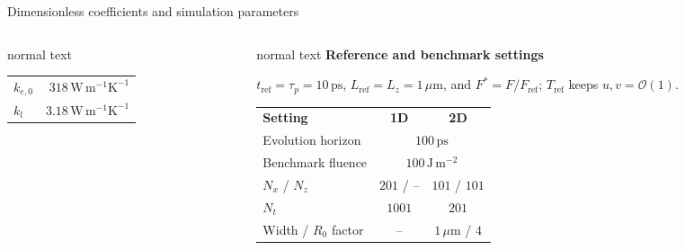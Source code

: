 \documentclass[aspectratio=169,10pt]{beamer}
\begin{document}
\begin{frame}[t]{Dimensionless coefficients and simulation parameters}
\begin{columns}[T,totalwidth=0.94\textwidth]
\begin{column}{0.42\textwidth}
\begin{beamercolorbox}[wd=\linewidth,sep=0.46em]{normal text}
\begin{tabular}{@{}lr@{}}
          \(k_{e,0}\) & \(318\,\mathrm{W\,m^{-1}K^{-1}}\) \\
          \(k_l\) & \(3.18\,\mathrm{W\,m^{-1}K^{-1}}\) \\
        \end{tabular}
      \end{beamercolorbox}
    \end{column}
    \begin{column}{0.48\textwidth}
      \begin{beamercolorbox}[wd=\linewidth,sep=0.46em]{normal text}
        \small\textbf{\color{GVTeal}Reference and benchmark settings}\par
        \vspace{0.07cm}
        \scriptsize
        \(t_{\mathrm{ref}}=\tau_p=10\,\mathrm{ps}\), \(L_{\mathrm{ref}}=L_z=1\,\mu\mathrm{m}\), and \(F^*=F/F_{\mathrm{ref}}\); \(T_{\mathrm{ref}}\) keeps \(u,v=\mathcal{O}(1)\).\par
        \vspace{0.08cm}
        \renewcommand{\arraystretch}{1.08}
        \begin{tabular}{@{}lcc@{}}
          \rowcolor{GVTealTint}
          \textbf{Setting} & \textbf{1D} & \textbf{2D} \\
          Evolution horizon & \multicolumn{2}{c}{\(100\,\mathrm{ps}\)} \\
          Benchmark fluence & \multicolumn{2}{c}{\(100\,\mathrm{J\,m^{-2}}\)} \\
          \(N_x\) / \(N_z\) & \(201\) / -- & \(101\) / \(101\) \\
          \(N_t\) & \(1001\) & \(201\) \\
          Width / \(R_0\) factor & -- & \(1\,\mu\mathrm{m}\) / \(4\) \\
        \end{tabular}
      \end{beamercolorbox}
    \end{column}
  \end{columns}
\end{frame}
\end{document}
